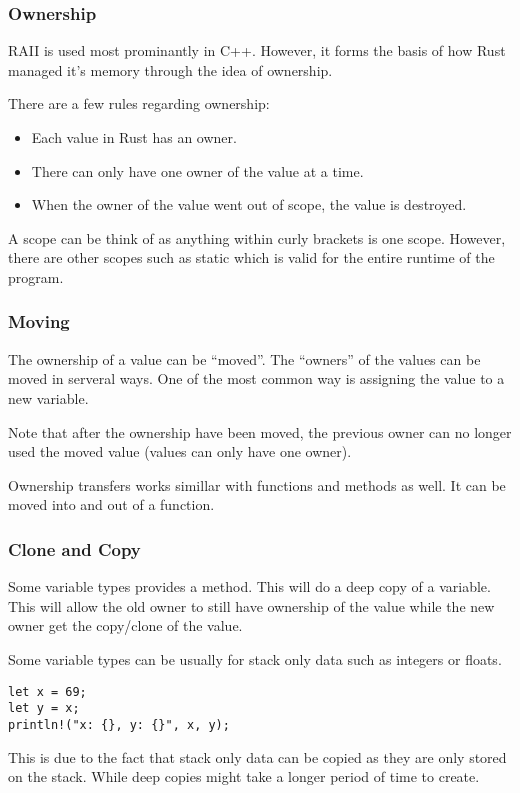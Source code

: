 \documentclass{beamer}
\begin{document}
\begin{frame}
  \frametitle{Ownership}
  RAII is used most prominantly in C++. However, it forms the basis of how Rust managed it's memory through the idea of ownership.

  There are a few rules regarding ownership:
  \begin{itemize}
    \item Each value in Rust has an owner.
    \item There can only have \alert{one} owner of the value at a time.
    \item When the owner of the value went out of scope, the value is destroyed.
  \end{itemize}

  A scope can be think of as anything within curly brackets is one scope. However, there are other scopes such as static which is valid for the entire runtime of the program.
\end{frame}

\begin{frame}[allowframebreaks]
  \frametitle{Moving}
  The ownership of a value can be ``moved''. The ``owners'' of the values can be moved in serveral ways. One of the most common way is assigning the value to a new variable.

  

  \alert{Note} that after the ownership have been moved, the previous owner can no longer used the moved value (values can only have one owner).

  \pagebreak

  Ownership transfers works simillar with functions and methods as well. It can be moved into and out of a function.
  
  

  \pagebreak
  
\end{frame}

\begin{frame}[fragile]
  \frametitle{Clone and Copy}
  Some variable types provides a  method. This will do a deep copy of a variable. This will allow the old owner to still have ownership of the value while the new owner get the copy/clone of the value.

  Some variable types can be  usually for stack only data such as integers or floats.
\begin{lstlisting}
let x = 69;
let y = x;
println!("x: {}, y: {}", x, y);
\end{lstlisting}
  This is due to the fact that stack only data can be copied as they are only stored on the stack. While deep copies might take a longer period of time to create.
\end{frame}
\end{document}
